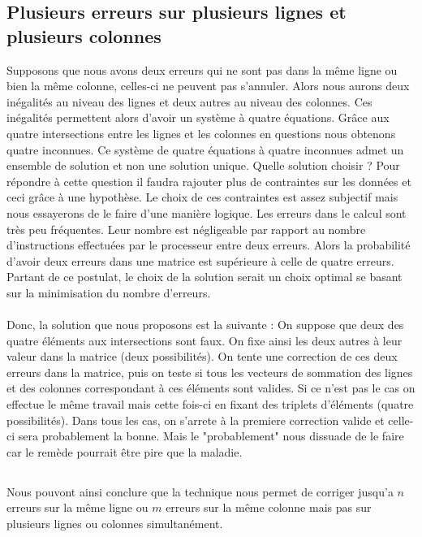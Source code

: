 \documentclass[a4paper, 10pt]{report}
\begin{document}
\subsection{Plusieurs erreurs sur plusieurs lignes et plusieurs colonnes}
Supposons que nous avons deux erreurs qui ne sont pas dans la même ligne ou bien la même colonne, celles-ci ne peuvent pas s’annuler. 
Alors nous aurons deux inégalités au niveau des lignes et deux autres au niveau des colonnes. Ces inégalités permettent 
alors d’avoir un système à quatre équations. Grâce aux quatre intersections entre les lignes et les colonnes en questions 
nous obtenons quatre inconnues.\newline
Ce système de quatre équations à quatre inconnues admet un ensemble de solution et non une solution unique. Quelle solution 
choisir ? Pour répondre à cette question il faudra rajouter plus de contraintes sur les données et ceci grâce à une hypothèse. 
Le choix de ces contraintes est assez subjectif mais nous essayerons de le faire d’une manière logique.
Les erreurs dans le calcul sont très peu fréquentes. Leur nombre est négligeable par rapport au nombre d’instructions 
effectuées par le processeur entre deux erreurs. Alors la probabilité d’avoir deux erreurs dans une matrice est supérieure 
à celle de quatre erreurs. Partant de ce postulat, le choix de la solution serait un choix optimal se basant sur la 
minimisation du nombre d’erreurs.
\paragraph*{}
Donc, la solution que nous proposons est la suivante :\newline
On suppose que deux des quatre éléments aux intersections sont faux. On fixe ainsi les deux autres à leur valeur dans 
la matrice (deux possibilités). On tente une correction de ces deux erreurs dans la matrice, puis on teste si tous les vecteurs de sommation 
des lignes et des colonnes correspondant à ces éléments sont valides. Si ce n'est pas le cas on effectue le même travail mais cette fois-ci
en fixant des triplets d'éléments (quatre possibilités). Dans tous les cas, on 
s'arrete à la premiere correction valide et celle-ci sera probablement la bonne.
Mais le "probablement" nous dissuade de le faire car le remède pourrait \^etre pire que la maladie.

\subsection*{}
Nous pouvont ainsi conclure que la technique nous permet de corriger jusqu'a $n$ erreurs sur la même ligne
ou $m$ erreurs sur la même colonne mais pas sur plusieurs lignes ou colonnes simultanément.
\end{document}
